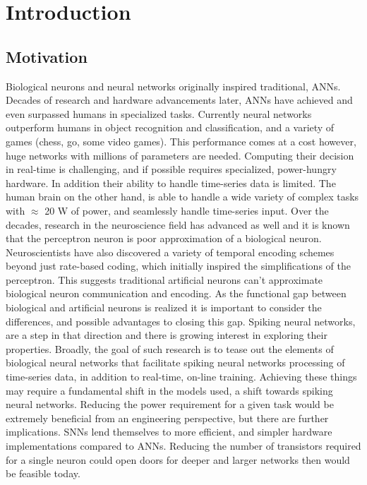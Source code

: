 %
%
%
%
%


\chapter{Introduction}\label{section:introduction}
\section{Motivation}
Biological neurons and neural networks originally inspired traditional,
ANNs. Decades of research and hardware advancements later, ANNs have achieved
and even surpassed humans in specialized tasks. Currently neural networks
outperform humans in object recognition and classification, and a variety of
games (chess, go, some video games). This performance comes at a cost however,
huge networks with millions of parameters are needed. Computing their decision
in real-time is challenging, and if possible requires specialized, power-hungry
hardware. In addition their ability to handle time-series data is limited. The
human brain on the other hand, is able to handle a wide variety of complex tasks
with $\approx$ 20 W of power, and seamlessly handle time-series input. Over the
decades, research in the neuroscience field has advanced as well and it is known
that the perceptron neuron is poor approximation of a biological
neuron. Neuroscientists have also discovered a variety of temporal encoding
schemes beyond just rate-based coding, which initially inspired the
simplifications of the perceptron. This suggests traditional artificial neurons
can't approximate biological neuron communication and encoding. As the
functional gap between biological and artificial neurons is realized it is
important to consider the differences, and possible advantages to closing this
gap. Spiking neural networks, are a step in that direction and there is growing
interest in exploring their properties. Broadly, the goal of such research is to
tease out the elements of biological neural networks that facilitate spiking
neural networks processing of time-series data, in addition to real-time,
on-line training. Achieving these things may require a fundamental shift in the
models used, a shift towards spiking neural networks. Reducing the power
requirement for a given task would be extremely beneficial from an engineering
perspective, but there are further implications. SNNs lend themselves to more
efficient, and simpler hardware implementations compared to ANNs. Reducing the
number of transistors required for a single neuron could open doors for deeper
and larger networks then would be feasible today.
    
